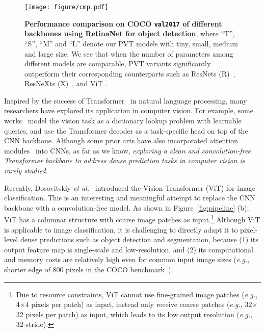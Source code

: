 \documentclass[10pt,twocolumn,letterpaper]{article}
\newcommand{\tablestyle}[2]{\setlength{\tabcolsep}{#1}\renewcommand{\arraystretch}{#2}\centering\footnotesize}
\def\eg{\emph{e.g.}}
\def\etal{{\em et al.~}}
\begin{document}
\begin{figure}[t]
	\centering
	\texttt{[image: figure/cmp.pdf]}
	\hspace{-42.5mm}\resizebox{.48\columnwidth}{!}{\tablestyle{2pt}{1}
	
	}
    
   \caption{\textbf{Performance comparison on COCO \texttt{val2017} of different backbones using RetinaNet for object detection}, where ``T'', ``S'', ``M'' and ``L'' denote our PVT models with tiny, small, medium and large size. We see that when the number of parameters among different models are comparable, PVT variants significantly outperform their corresponding counterparts such as ResNets (R)~\cite{he2016deep}, ResNeXts (X)~\cite{xie2017aggregated}, and ViT \cite{dosovitskiy2020image}.
}

\label{fig:cmp}
\end{figure}

Inspired by the success of Transformer~\cite{vaswani2017attention} in natural language processing,
many researchers have explored its application in computer vision.
%
For example, some works~\cite{carion2020end,zhu2020deformable,xie2021segmenting,sun2020transtrack,hu2021Transformer,liu2021vst} model the vision task as a dictionary lookup problem with learnable queries, and use the Transformer decoder
as a task-specific head on top of the CNN backbone.
%
Although some prior arts have also incorporated attention modules~\cite{wang2018non,ramachandran2019stand,zhao2020exploring} into CNNs, 
as far as we know, \emph{exploring a clean and convolution-free Transformer backbone to address dense prediction tasks in computer vision is rarely studied}.
%


Recently, Dosovitskiy \etal\cite{dosovitskiy2020image} introduced the Vision Transformer (ViT) for image classification.
%
This is an interesting and meaningful attempt to replace the CNN backbone with a convolution-free model. 
%
As shown in Figure~\ref{fig:pipeline} (b), ViT has a columnar structure with coarse image patches
as input.\footnote{Due to resource constraints, ViT cannot use fine-grained image patches (\eg, 4$\times$4 pixels per patch) as input, instead only receive coarse patches (\eg, 32$\times$32 pixels per patch) as input, which leads to its low output resolution (\eg, 32-stride).}
%
Although ViT is applicable to image classification, it is challenging to directly 
% 
adapt it to pixel-level dense predictions such as object detection and segmentation, because 
(1) its output feature map is single-scale and low-resolution,
%
and (2) its computational and memory costs are relatively high even for common input image sizes (\eg, shorter edge of 800 pixels in the COCO benchmark~\cite{lin2014microsoft}). 
\end{document}
